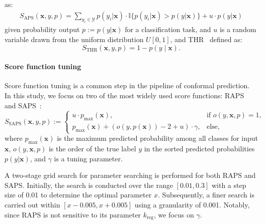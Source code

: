 \documentclass{article}
\newcommand{\1}{\mathbbm{1}}
\theoremstyle{plain}
\theoremstyle{definition}
\theoremstyle{remark}
\begin{document}
as:
\begin{equation}
    \label{eq:aps}
    \begin{aligned}
        S_{\text{APS}}(\boldsymbol{x}, y, p) = \sum_{y_i \in \mathcal{Y}} 
        p(y_i|\boldsymbol{x}) \cdot 
        \mathbb{I}\{p(y_i|\boldsymbol{x}) > p(y|\boldsymbol{x})\} + u \cdot p(y|\boldsymbol{x})
    \end{aligned}
\end{equation}
given probability output \(p := p(y|\boldsymbol{x})\) for a classification task, and \(u\) is a random variable drawn from the uniform distribution \(U[0,1]\), and THR~\citep{sadinle2019least} defined as:
\begin{equation}
    \label{eq:thr}
S_{\text{THR}}(\boldsymbol{x}, y, p) = 1 - p(y\mid \boldsymbol{x}).
\end{equation}



\paragraph{Score function tuning}
Score function tuning is a common step in the pipeline of conformal prediction. In this study, we focus on two of the most widely used score functions: RAPS~\citep{angelopoulos2021uncertainty} and SAPS~\citep{huang2024conformal}:
\begin{equation*}
    S_{\text{SAPS}}(\boldsymbol{x}, y, p) := 
    \begin{cases} 
        u \cdot p_{\max}(\boldsymbol{x}), & \text{if } o(y, \boldsymbol{x}, p) = 1, \\
        p_{\max}(\boldsymbol{x}) + (o(y, p(\boldsymbol{x})) - 2 + u) \cdot \gamma, & \text{else},
    \end{cases}
\end{equation*}
where \( p_{\max}(\boldsymbol{x}) \) is the maximum predicted probability among all classes for input \( \boldsymbol{x} \), \( o(y, \boldsymbol{x}, p) \) is the order of the true label \( y \) in the sorted predicted probabilities \(p(y|\boldsymbol{x})\), and \( \gamma \) is a tuning parameter.

A two-stage grid search for parameter searching is performed for both RAPS and SAPS\@. Initially, the search is conducted over the range $[0.01, 0.3]$ with a step size of 0.01 to determine the optimal parameter $x$. Subsequently, a finer search is carried out within $[x - 0.005, x + 0.005]$ using a granularity of 0.001. Notably, since RAPS is not sensitive to its parameter $k_{\text{reg}}$, we focus on $\gamma$.
\end{document}
